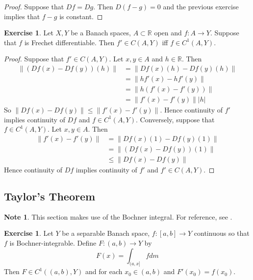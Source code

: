 \documentclass[12pt]{amsart}
\theoremstyle{definition}
\newtheorem{note}[definition]{Note}
\newtheorem{ex}[definition]{Exercise}
\newcommand{\R}{\mathbb{R}}
\newcommand{\lex}[1]{\label{ex:#1}}
\begin{document}
	\begin{proof}
		Suppose that $Df = Dg$. Then $D(f-g) = 0$ and the previous exercise implies that $f -g$ is constant.
	\end{proof}		
	
	\begin{ex} \lex{64006}
	Let $X, Y$ be a Banach spaces, $A \subset \R$ open and $f:A \rightarrow Y$. Suppose that $f$ is Frechet differentiable. Then $f' \in C(A,Y)$ iff $f \in C^1(A,Y)$.
	\end{ex}
	
	\begin{proof}
	Suppose that $f' \in C(A, Y)$. Let $x,y \in A$ and $h \in \R$. Then 
	\begin{align*}
	\|(Df(x)- Df(y))(h)\| 
	&= \|Df(x)(h) - Df(y)(h)\| \\
	&=  \|hf'(x) - hf'(y)\| \\
	&= \|h(f'(x) - f'(y))\| \\
	&= \|f'(x) - f'(y)\||h|
	\end{align*}
	So $\|Df(x) - Df(y)\| \leq \|f'(x) - f'(y)\|$. Hence continuity of $f'$ implies continuity of $Df$ and $f \in C^1(A, Y)$.
	Conversely, suppose that $f \in C^1(A, Y)$. Let $x,y \in A$. Then 
	\begin{align*}
	\|f'(x) - f'(y)\| 
	&= \|Df(x)(1) - Df(y)(1)\| \\
	&= \|(Df(x) - Df(y))(1)\| \\
	& \leq \| Df(x) - Df(y)\|
	\end{align*}
	Hence continuity of $Df$ implies continuity of $f'$ and $f' \in C(A, Y)$.
	\end{proof}
	
	
	
	
	
	
	
	
	
	
	\newpage
	\subsection{Taylor's Theorem}
	
	\begin{note}
	This section makes use of the Bochner integral. For reference, see .
	\end{note}
	
	\begin{ex} \lex{}
	Let $Y$ be a separable Banach space, $f:[a,b] \rightarrow Y$ continuous so that $f$ is Bochner-integrable. Define $F:(a,b) \rightarrow Y$ by  $$F(x) = \int_{(a, x]}f dm$$ Then $F \in C^1((a,b), Y)$ and for each $x_0 \in (a,b)$ and $F'(x_0) = f(x_0)$.
	\end{ex}
	
\end{document}
